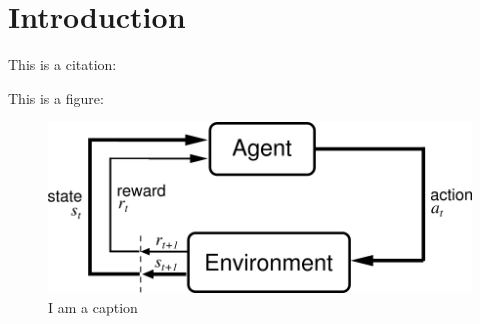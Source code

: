 \chapter{Introduction}
\label{chap:introduction}
This is a citation: \cite{Vaswani2017}


This is a figure: 

\begin{figure}[ht]
    \centering
    \includegraphics[width=.5\textwidth]{figures/AgentEnviornment.png}
    \caption{I am a caption}
    \label{fig:my_label}
\end{figure}